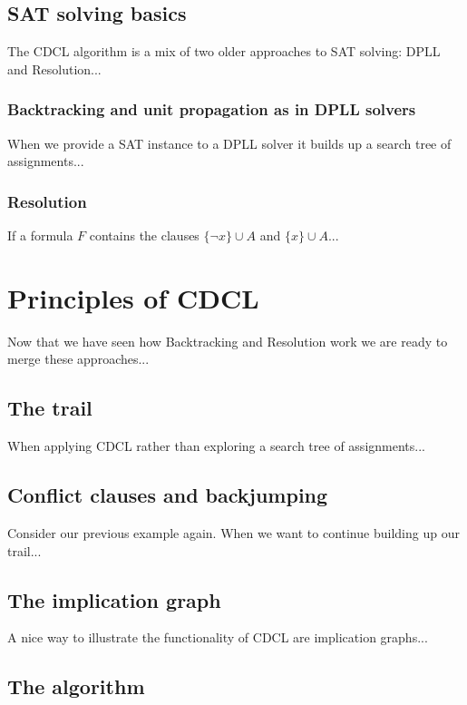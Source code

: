 \newpage
\subsection{SAT solving basics}

The CDCL algorithm is a mix of two older approaches to SAT solving: DPLL and Resolution...

\subsubsection{Backtracking and unit propagation as in DPLL solvers}

When we provide a SAT instance to a DPLL solver it builds up a search tree of assignments...

\subsubsection{Resolution}

If a formula \(F\) contains the clauses \(\{\neg x\} \cup A\) and \(\{x\} \cup A\)...

\section{Principles of CDCL}

Now that we have seen how Backtracking and Resolution work we are ready to merge these approaches...

\subsection{The trail}

When applying CDCL rather than exploring a search tree of assignments...

\subsection{Conflict clauses and backjumping}

Consider our previous example again. When we want to continue building up our trail...

\subsection{The implication graph}

A nice way to illustrate the functionality of CDCL are implication graphs...

\subsection{The algorithm}

